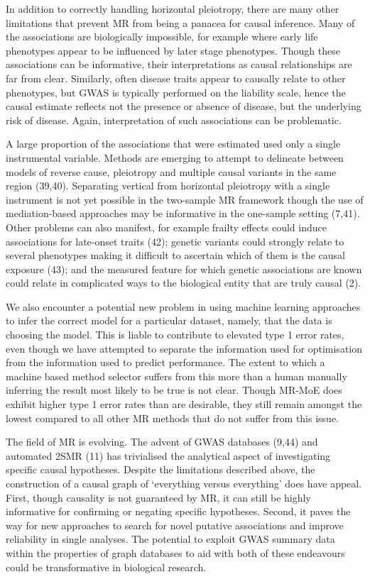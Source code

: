 \documentclass[]{article}
\begin{document}
In addition to correctly handling horizontal pleiotropy, there are many
other limitations that prevent MR from being a panacea for causal
inference. Many of the associations are biologically impossible, for
example where early life phenotypes appear to be influenced by later
stage phenotypes. Though these associations can be informative, their
interpretations as causal relationships are far from clear. Similarly,
often disease traits appear to causally relate to other phenotypes, but
GWAS is typically performed on the liability scale, hence the causal
estimate reflects not the presence or absence of disease, but the
underlying risk of disease. Again, interpretation of such associations
can be problematic.

A large proportion of the associations that were estimated used only a
single instrumental variable. Methods are emerging to attempt to
delineate between models of reverse cause, pleiotropy and multiple
causal variants in the same region (39,40). Separating vertical from
horizontal pleiotropy with a single instrument is not yet possible in
the two-sample MR framework though the use of mediation-based approaches
may be informative in the one-sample setting (7,41). Other problems can
also manifest, for example frailty effects could induce associations for
late-onset traits (42); genetic variants could strongly relate to
several phenotypes making it difficult to ascertain which of them is the
causal exposure (43); and the measured feature for which genetic
associations are known could relate in complicated ways to the
biological entity that are truly causal (2).

We also encounter a potential new problem in using machine learning
approaches to infer the correct model for a particular dataset, namely,
that the data is choosing the model. This is liable to contribute to
elevated type 1 error rates, even though we have attempted to separate
the information used for optimisation from the information used to
predict performance. The extent to which a machine based method selector
suffers from this more than a human manually inferring the result most
likely to be true is not clear. Though MR-MoE does exhibit higher type 1
error rates than are desirable, they still remain amongst the lowest
compared to all other MR methods that do not suffer from this issue.

The field of MR is evolving. The advent of GWAS databases (9,44) and
automated 2SMR (11) has trivialised the analytical aspect of
investigating specific causal hypotheses. Despite the limitations
described above, the construction of a causal graph of `everything
versus everything' does have appeal. First, though causality is not
guaranteed by MR, it can still be highly informative for confirming or
negating specific hypotheses. Second, it paves the way for new
approaches to search for novel putative associations and improve
reliability in single analyses. The potential to exploit GWAS summary
data within the properties of graph databases to aid with both of these
endeavours could be transformative in biological research.
\end{document}
